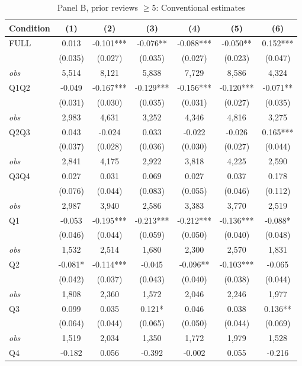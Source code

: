 \begin{table}[!htbp]
\centering
\caption{Panel B, prior reviews $\geq 5$: Conventional estimates}
\label{tab:trim00:b:prior_reviews_ge5}
\small
\begin{tabular}{lcccccc}
\toprule
Condition & (1) & (2) & (3) & (4) & (5) & (6) \\
\midrule
FULL & 0.013 & -0.101*** & -0.076** & -0.088*** & -0.050** & 0.152*** \\
 & (0.035) & (0.027) & (0.035) & (0.027) & (0.023) & (0.047) \\
\textit{obs} & 5,514 & 8,121 & 5,838 & 7,729 & 8,586 & 4,324 \\
Q1Q2 & -0.049 & -0.167*** & -0.129*** & -0.156*** & -0.120*** & -0.071** \\
 & (0.031) & (0.030) & (0.035) & (0.031) & (0.027) & (0.035) \\
\textit{obs} & 2,983 & 4,631 & 3,252 & 4,346 & 4,816 & 3,275 \\
Q2Q3 & 0.043 & -0.024 & 0.033 & -0.022 & -0.026 & 0.165*** \\
 & (0.037) & (0.028) & (0.036) & (0.030) & (0.027) & (0.044) \\
\textit{obs} & 2,841 & 4,175 & 2,922 & 3,818 & 4,225 & 2,590 \\
Q3Q4 & 0.027 & 0.031 & 0.069 & 0.027 & 0.037 & 0.178 \\
 & (0.076) & (0.044) & (0.083) & (0.055) & (0.046) & (0.112) \\
\textit{obs} & 2,987 & 3,940 & 2,586 & 3,383 & 3,770 & 2,519 \\
Q1 & -0.053 & -0.195*** & -0.213*** & -0.212*** & -0.136*** & -0.088* \\
 & (0.046) & (0.044) & (0.059) & (0.050) & (0.040) & (0.048) \\
\textit{obs} & 1,532 & 2,514 & 1,680 & 2,300 & 2,570 & 1,831 \\
Q2 & -0.081* & -0.114*** & -0.045 & -0.096** & -0.103*** & -0.065 \\
 & (0.042) & (0.037) & (0.043) & (0.040) & (0.038) & (0.044) \\
\textit{obs} & 1,808 & 2,360 & 1,572 & 2,046 & 2,246 & 1,977 \\
Q3 & 0.099 & 0.035 & 0.121* & 0.046 & 0.038 & 0.136** \\
 & (0.064) & (0.044) & (0.065) & (0.050) & (0.044) & (0.069) \\
\textit{obs} & 1,519 & 2,034 & 1,350 & 1,772 & 1,979 & 1,528 \\
Q4 & -0.182 & 0.056 & -0.392 & -0.002 & 0.055 & -0.216 \\

\end{tabular}
\end{table}
